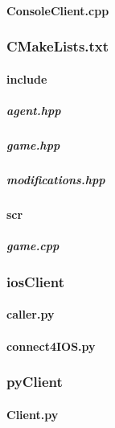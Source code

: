 \documentclass[12pt]{article}
\newcommand{\incFile}[2]{\label{code:#2}\newpage}
\begin{document}
\paragraph{ConsoleClient.cpp}										\incFile{C++}{Clients/ConsoleClient/ConsoleClient.cpp}
\subsubsection{CMakeLists.txt}										\incFile{python}{Clients/ConsoleClient/CMakeLists.txt}

\paragraph{include}														%
\subparagraph{agent.hpp}												\incFile{C++}{Clients/ConsoleClient/include/agent.hpp}
\subparagraph{game.hpp}												\incFile{C++}{Clients/ConsoleClient/include/game.hpp}
\subparagraph{modifications.hpp}								\incFile{C++}{Clients/ConsoleClient/include/modifications.hpp}

\paragraph{scr}																%
\subparagraph{game.cpp}												\incFile{C++}{Clients/ConsoleClient/scr/game.cpp}

\subsubsection{iosClient}												%
\paragraph{caller.py}														\incFile{python}{Clients/iosClient/caller.py}
\paragraph{connect4IOS.py}											\incFile{python}{Clients/iosClient/connect4IOS.py}

\subsubsection{pyClient}												%
\paragraph{Client.py}														\incFile{python}{Clients/pyClient/Client.py}
\end{document}

